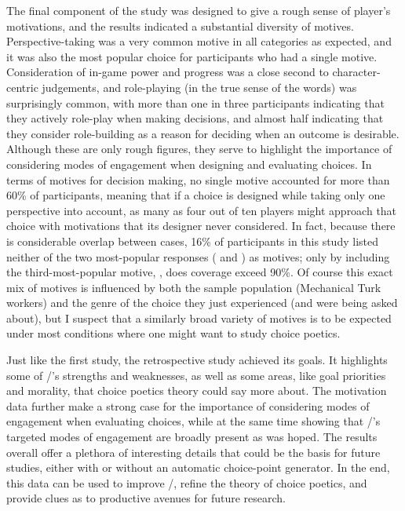 The final component of the study was designed to give a rough sense of player's motivations, and the results indicated a substantial diversity of motives.
%
Perspective-taking was a very common motive in all categories as expected, and it was also the most popular choice for participants who had a single motive.
%
Consideration of in-game power and progress was a close second to character-centric judgements, and role-playing (in the true sense of the words) was surprisingly common, with more than one in three participants indicating that they actively role-play when making decisions, and almost half indicating that they consider role-building as a reason for deciding when an outcome is desirable.
%
Although these are only rough figures, they serve to highlight the importance of considering modes of engagement when designing and evaluating choices.
%
In terms of motives for decision making, no single motive accounted for more than 60\% of participants, meaning that if a choice is designed while taking only one perspective into account, as many as four out of ten players might approach that choice with motivations that its designer never considered.
%
In fact, because there is considerable overlap between cases, 16\% of participants in this study listed neither of the two most-popular responses ( and ) as motives; only by including the third-most-popular motive, , does coverage exceed 90\%.
%
Of course this exact mix of motives is influenced by both the sample population (Mechanical Turk workers) and the genre of the choice they just experienced (and were being asked about), but I suspect that a similarly broad variety of motives is to be expected under most conditions where one might want to study choice poetics.


Just like the first study, the retrospective study achieved its goals.
%
It highlights some of \dunyazad/'s strengths and weaknesses, as well as some areas, like goal priorities and morality, that choice poetics theory could say more about.
%
The motivation data further make a strong case for the importance of considering modes of engagement when evaluating choices, while at the same time showing that \dunyazad/'s targeted modes of engagement are broadly present as was hoped.
%
The results overall offer a plethora of interesting details that could be the basis for future studies, either with or without an automatic choice-point generator.
%
In the end, this data can be used to improve \dunyazad/, refine the theory of choice poetics, and provide clues as to productive avenues for future research.


